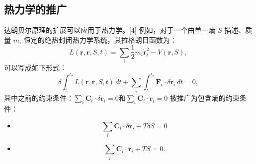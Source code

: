 \subsection{热力学的推广}
达朗贝尔原理的扩展可以应用于热力学。[4] 例如，对于一个由单一熵 \( S \) 描述、质量 \( m_i \) 恒定的绝热封闭热力学系统，其拉格朗日函数为：
\[
L(\mathbf{r}, \dot{\mathbf{r}}, S, t) = \sum_i \frac{1}{2} m_i \dot{\mathbf{r}}_i^2 - V(\mathbf{r}, S),~
\]
可以写成如下形式：
\[
\delta \int_{t_1}^{t_2} L(\mathbf{r}, \dot{\mathbf{r}}, S, t) \, dt + \sum_i \int_{t_1}^{t_2} \mathbf{F}_i \cdot \delta \mathbf{r}_i \, dt = 0,~
\]
其中之前的约束条件：\(\sum_i \mathbf{C}_i \cdot \delta \mathbf{r}_i = 0\)和\(\sum_i \mathbf{C}_i \cdot \dot{\mathbf{r}}_i = 0\)
被推广为包含熵的约束条件：
\begin{itemize}
\item \[\sum_i \mathbf{C}_i \cdot \delta \mathbf{r}_i + T \delta S = 0~\]
\item \[\sum_i \mathbf{C}_i \cdot \dot{\mathbf{r}}_i + T \dot{S} = 0.~\]
\end{itemize}